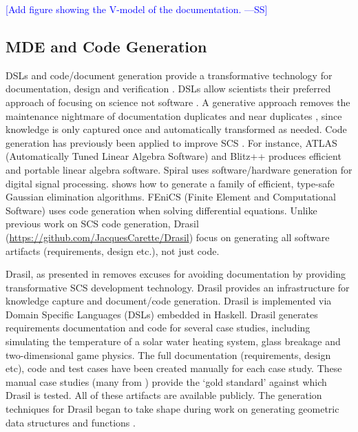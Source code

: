 \documentclass[12pt]{article}
\newcommand{\authornote}[3]{\textcolor{#1}{[#3 ---#2]}}
\newcommand{\authornote}[3]{}
\newcommand{\wss}[1]{\authornote{blue}{SS}{#1}} %
\begin{document}
\wss{Add figure showing the V-model of the documentation.}

\subsection{MDE and Code Generation} \label{SecMDE}

DSLs and code/document generation provide a transformative technology for
documentation, design and verification \citep{JohansonAndHasselbring2018,
  Smith2018}.  DSLs allow scientists their preferred approach of focusing on
science not software \citep{Kelly2007}.  A generative approach removes the
maintenance nightmare of documentation duplicates and near duplicates
\citep{LucivEtAl2018}, since knowledge is only captured once and automatically
transformed as needed.  Code generation has previously been applied to improve
SCS \citep{WhaleyEtAl2001, Veldhuizen1998, Pueschel2001}.  For instance, ATLAS
(Automatically Tuned Linear Algebra Software) \citep{WhaleyEtAl2001} and Blitz++
\citep{Veldhuizen1998} produces efficient and portable linear algebra software.
Spiral \citep{Pueschel2001} uses software/hardware generation for digital signal
processing.  \citet{Carette2008} shows how to generate a family of efficient,
type-safe Gaussian elimination algorithms.  FEniCS (Finite Element and
Computational Software) \citep{LoggEtAl2012} uses code generation when solving
differential equations.  Unlike previous work on SCS code generation, Drasil
(\href{https://github.com/JacquesCarette/Drasil}
{https://github.com/JacquesCarette/Drasil}) focus on generating all software
artifacts (requirements, design etc.), not just code.

Drasil, as presented in \citet{SzymczakEtAl2016} removes excuses for avoiding
documentation by providing transformative SCS development technology.  Drasil
provides an infrastructure for knowledge capture and document/code generation.
Drasil is implemented via Domain Specific Languages (DSLs) embedded in Haskell.
Drasil generates requirements documentation and code for several case studies,
including simulating the temperature of a solar water heating system, glass
breakage and two-dimensional game physics.  The full documentation
(requirements, design etc), code and test cases have been created manually for
each case study.  These manual case studies (many from
\citet{SmithJegatheesanAndKelly2016}) provide the `gold standard' against which
Drasil is tested.  All of these artifacts are available publicly.  The
generation techniques for Drasil began to take shape during work on generating
geometric data structures and functions \citep{CaretteEtAl2011}.
\end{document}
